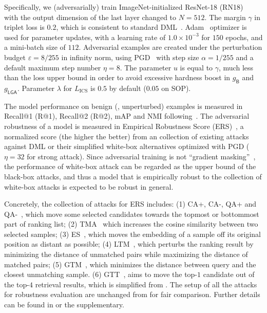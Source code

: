 \documentclass[10pt,twocolumn,letterpaper]{article}
\begin{document}



Specifically, we (adversarially) train ImageNet-initialized ResNet-18
(RN18)~\cite{resnet} with the output dimension of the last layer changed to
$N{=}512$.
%
The margin $\gamma$ in triplet loss is $0.2$, which is consistent to standard
DML~\cite{revisiting}.
%
Adam~\cite{adam} optimizer is used for parameter updates, with a learning rate
of $1.0{\times}10^{-3}$ for $150$ epochs, and a mini-batch size of $112$.
%
Adversarial examples are created under the perturbation budget
$\varepsilon{=}8/255$ in infinity norm, using PGD~\cite{madry} with step size
$\alpha{=}1/255$ and a default maximum step number $\eta{=}8$.
%
The parameter $u$ is equal to $\gamma$, much less than the loss upper bound
in order to avoid excessive hardness boost in $g_\mathsf{B}$ and $g_\mathsf{LGA}$.
%
Parameter $\lambda$ for $L_\text{ICS}$ is $0.5$ by default ($0.05$ on SOP).

The model performance on benign (\ie, unperturbed) examples is measured in
Recall@1 (R@1), Recall@2 (R@2), mAP and NMI
following~\cite{revisiting,robrank}.
%
The adversarial robustness of a model is measured in Empirical Robustness Score
(ERS)~\cite{robrank}, a normalized score (the higher the better) from
an collection of existing attacks against DML or their simplified white-box
alternatives optimized with PGD ($\eta=32$ for strong attack).
%
Since adversarial training is not ``gradient masking''~\cite{obfuscated}, the
performance of white-box attack can be regarded as the upper bound of the
black-box attacks, and thus a model that is empirically robust to the collection
of white-box attacks is expected to be robust in general.

Concretely, the collection of attacks for ERS includes:
%
(1) CA+, CA-, QA+ and QA-~\cite{advrank}, which move some selected candidates
towards the topmost or bottommost part of ranking list;
%
(2) TMA~\cite{flowertower} which increases the cosine similarity between two selected samples;
%
(3) ES~\cite{advrank,advdpqn}, which moves the embedding of a sample off its original position as
distant as possible;
%
(4) LTM~\cite{learn-to-misrank}, which perturbs the ranking result by minimizing the distance of
unmatched pairs while maximizing the distance of matched pairs;
%
(5) GTM~\cite{robrank}, which minimizes the distance between query and the
closest unmatching sample.
%
(6) GTT~\cite{robrank}, aims to move the top-$1$ candidate out of the top-$4$
retrieval results, which is simplified from \cite{qair}.
%
The setup of all the attacks for robustness evaluation are unchanged from
\cite{robrank} for fair comparison.
%
Further details can be found in \cite{robrank} or the supplementary.
\end{document}
